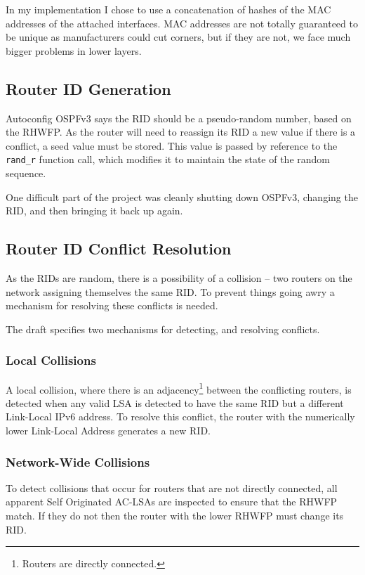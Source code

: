 \documentclass[12pt,a4paper,twoside]{report}
\begin{document}
In my implementation I chose to use a concatenation of hashes of the MAC
 addresses of the
attached interfaces. MAC addresses are not totally guaranteed to be
unique as manufacturers could cut corners, but if they are not, we face much
bigger problems in lower layers.

\subsection{Router ID Generation}
Autoconfig OSPFv3 says the RID should be a pseudo-random number, based on
the RHWFP\@. As the router will need to reassign its RID a new value if
there is a conflict, a seed value must be stored. This value is passed by
reference to the \texttt{rand\_r} function call, which modifies it to maintain
the state of the random sequence.

One difficult part of the project was cleanly shutting down OSPFv3, changing
the RID, and then bringing it back up again. 

\subsection{Router ID Conflict Resolution}
As the RIDs are random, there is a possibility of a collision -- two
routers on the network assigning themselves the same RID\@. To prevent
things going awry a mechanism for resolving these conflicts is needed. 

The draft specifies two mechanisms for detecting, and resolving conflicts. 

\subsubsection{Local Collisions}
A local collision, where there is an adjacency\footnote{Routers are
directly connected.} between the conflicting routers, is detected when any
valid LSA is detected to have the same RID but a different Link-Local
IPv6 address. To resolve this conflict, the router with the numerically lower
Link-Local Address generates a new RID\@. 

\subsubsection{Network-Wide Collisions}
To detect collisions that occur for routers that are not directly connected,
all apparent Self Originated AC-LSAs are inspected to ensure that the RHWFP
match. If they do not then the router with the lower RHWFP must change its
RID.
\end{document}

